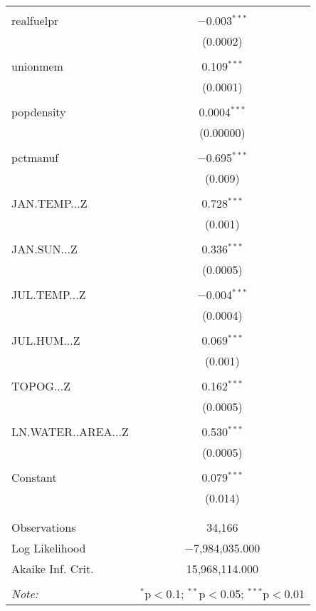 \documentclass{article}
\begin{document}
\begin{table}[!htbp]
\begin{tabular}{@{\extracolsep{5pt}}lc}
  & \\ 
 realfuelpr & $-$0.003$^{***}$ \\ 
  & (0.0002) \\ 
  & \\ 
 unionmem & 0.109$^{***}$ \\ 
  & (0.0001) \\ 
  & \\ 
 popdensity & 0.0004$^{***}$ \\ 
  & (0.00000) \\ 
  & \\ 
 pctmanuf & $-$0.695$^{***}$ \\ 
  & (0.009) \\ 
  & \\ 
 JAN.TEMP...Z & 0.728$^{***}$ \\ 
  & (0.001) \\ 
  & \\ 
 JAN.SUN...Z & 0.336$^{***}$ \\ 
  & (0.0005) \\ 
  & \\ 
 JUL.TEMP...Z & $-$0.004$^{***}$ \\ 
  & (0.0004) \\ 
  & \\ 
 JUL.HUM...Z & 0.069$^{***}$ \\ 
  & (0.001) \\ 
  & \\ 
 TOPOG...Z & 0.162$^{***}$ \\ 
  & (0.0005) \\ 
  & \\ 
 LN.WATER..AREA...Z & 0.530$^{***}$ \\ 
  & (0.0005) \\ 
  & \\ 
 Constant & 0.079$^{***}$ \\ 
  & (0.014) \\ 
  & \\ 
\hline \\[-1.8ex] 
Observations & 34,166 \\ 
Log Likelihood & $-$7,984,035.000 \\ 
Akaike Inf. Crit. & 15,968,114.000 \\ 
\hline 
\hline \\[-1.8ex] 
\textit{Note:}  & \multicolumn{1}{r}{$^{*}$p$<$0.1; $^{**}$p$<$0.05; $^{***}$p$<$0.01} \\ 
\end{tabular} 
\end{table} 
\end{document}

